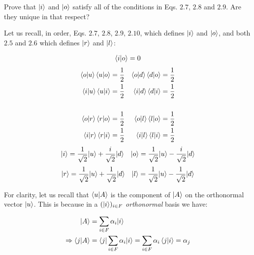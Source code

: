 \documentclass[solutions.tex]{subfiles}
\begin{document}
\maketitle
\begin{exercise}
Prove that $|i\rangle$ and $|o\rangle$ satisfy all of the
conditions in Eqs. $2.7$, $2.8$ and $2.9$. Are they unique
in that respect?
\end{exercise}
\hrr

Let us recall, in order, Eqs. $2.7$, $2.8$, $2.9$,
$2.10$, which defines $|i\rangle$ and $|o\rangle$, and both
$2.5$ and $2.6$ which defines $|r\rangle$ and $|l\rangle$:

\begin{align*}
\left\langle i \middle| o \right\rangle &= 0 \\
\end{align*}
\begin{align*}
\left\langle o \middle| u \right\rangle\left\langle u \middle| o \right\rangle &= \frac1{2} &
\left\langle o \middle| d \right\rangle\left\langle d \middle| o \right\rangle &= \frac1{2} \\
\left\langle i \middle| u \right\rangle\left\langle u \middle| i \right\rangle &= \frac1{2} &
\left\langle i \middle| d \right\rangle\left\langle d \middle| i \right\rangle &= \frac1{2} \\
~ & ~ \\
\left\langle o \middle| r \right\rangle\left\langle r \middle| o \right\rangle &= \frac1{2} &
\left\langle o \middle| l \right\rangle\left\langle l \middle| o \right\rangle &= \frac1{2} \\
\left\langle i \middle| r \right\rangle\left\langle r \middle| i \right\rangle &= \frac1{2} &
\left\langle i \middle| l \right\rangle\left\langle l \middle| i \right\rangle &= \frac1{2} \\
\end{align*}
\begin{align*}
|i\rangle &= \frac1{\sqrt2}|u\rangle + \frac{i}{\sqrt2}|d\rangle &
|o\rangle &= \frac1{\sqrt2}|u\rangle - \frac{i}{\sqrt2}|d\rangle \\
\end{align*}
\begin{align*}
|r\rangle &= \frac{1}{\sqrt2}|u\rangle + \frac{1}{\sqrt2}|d\rangle &
|l\rangle &= \frac{1}{\sqrt2}|u\rangle - \frac{1}{\sqrt2}|d\rangle \\
\end{align*}

For clarity, let us recall that $\left\langle u \middle| A \right\rangle$ is the component
of $|A\rangle$ on the orthonormal vector $|u\rangle$. This is because
in a $(|i\rangle)_{i\in F}$ \textit{orthonormal} basis we have:

\begin{align*}
|A\rangle &= \sum_{i\in F} \alpha_i|i\rangle \\
\Rightarrow \left\langle j \middle| A \right\rangle &= \langle j|\sum_{i\in F} \alpha_i|i\rangle
= \sum_{i\in F} \alpha_i\left\langle j \middle| i \right\rangle
= \alpha_j
\end{align*}
\end{document}
